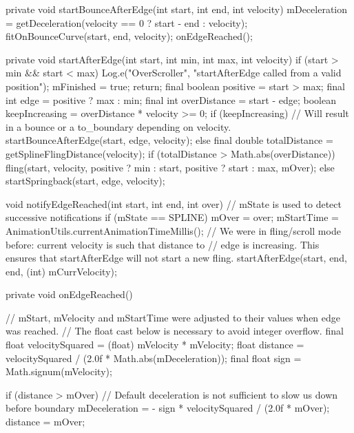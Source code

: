 {{        private void startBounceAfterEdge(int start, int end, int velocity) {
            mDeceleration = getDeceleration(velocity == 0 ? start - end : velocity);
            fitOnBounceCurve(start, end, velocity);
            onEdgeReached();
        }

        private void startAfterEdge(int start, int min, int max, int velocity) {
            if (start > min && start < max) {
                Log.e("OverScroller", "startAfterEdge called from a valid position");
                mFinished = true;
                return;
            }
            final boolean positive = start > max;
            final int edge = positive ? max : min;
            final int overDistance = start - edge;
            boolean keepIncreasing = overDistance * velocity >= 0;
            if (keepIncreasing) {
                // Will result in a bounce or a to_boundary depending on velocity.
                startBounceAfterEdge(start, edge, velocity);
            } else {
                final double totalDistance = getSplineFlingDistance(velocity);
                if (totalDistance > Math.abs(overDistance)) {
                    fling(start, velocity, positive ? min : start, positive ? start : max, mOver);
                } else {
                    startSpringback(start, edge, velocity);
                }
            }
        }

        void notifyEdgeReached(int start, int end, int over) {
            // mState is used to detect successive notifications 
            if (mState == SPLINE) {
                mOver = over;
                mStartTime = AnimationUtils.currentAnimationTimeMillis();
                // We were in fling/scroll mode before: current velocity is such that distance to
                // edge is increasing. This ensures that startAfterEdge will not start a new fling.
                startAfterEdge(start, end, end, (int) mCurrVelocity);
            }
        }

        private void onEdgeReached() {
            // mStart, mVelocity and mStartTime were adjusted to their values when edge was reached.
            // The float cast below is necessary to avoid integer overflow.
            final float velocitySquared = (float) mVelocity * mVelocity;
            float distance = velocitySquared / (2.0f * Math.abs(mDeceleration));
            final float sign = Math.signum(mVelocity);

            if (distance > mOver) {
                // Default deceleration is not sufficient to slow us down before boundary
                 mDeceleration = - sign * velocitySquared / (2.0f * mOver);
                 distance = mOver;
            }

}}}
